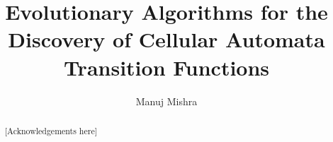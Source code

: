 \documentclass[a4paper, twoside]{report}
\title{Evolutionary Algorithms for the Discovery of Cellular Automata Transition Functions}
\author{Manuj Mishra}
\begin{document}


\begin{abstract}

\end{abstract}

\renewcommand{\abstractname}{Acknowledgements}
\begin{abstract}
[Acknowledgements here]
\end{abstract}

\tableofcontents
\listoffigures
\listoftables
\listofalgorithms














\end{document}
